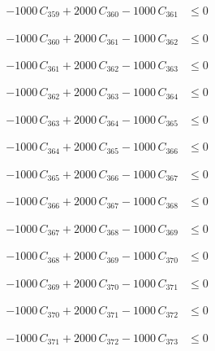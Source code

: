 \documentclass[a4paper,11pt]{article}
\begin{document}
\begin{align}
-1000\,C_{359} + 2000\,C_{360} - 1000\,C_{361} &\leq 0 \nonumber
\end{align}

\begin{align}
-1000\,C_{360} + 2000\,C_{361} - 1000\,C_{362} &\leq 0 \nonumber
\end{align}

\begin{align}
-1000\,C_{361} + 2000\,C_{362} - 1000\,C_{363} &\leq 0 \nonumber
\end{align}

\begin{align}
-1000\,C_{362} + 2000\,C_{363} - 1000\,C_{364} &\leq 0 \nonumber
\end{align}

\begin{align}
-1000\,C_{363} + 2000\,C_{364} - 1000\,C_{365} &\leq 0 \nonumber
\end{align}

\begin{align}
-1000\,C_{364} + 2000\,C_{365} - 1000\,C_{366} &\leq 0 \nonumber
\end{align}

\begin{align}
-1000\,C_{365} + 2000\,C_{366} - 1000\,C_{367} &\leq 0 \nonumber
\end{align}

\begin{align}
-1000\,C_{366} + 2000\,C_{367} - 1000\,C_{368} &\leq 0 \nonumber
\end{align}

\begin{align}
-1000\,C_{367} + 2000\,C_{368} - 1000\,C_{369} &\leq 0 \nonumber
\end{align}

\begin{align}
-1000\,C_{368} + 2000\,C_{369} - 1000\,C_{370} &\leq 0 \nonumber
\end{align}

\begin{align}
-1000\,C_{369} + 2000\,C_{370} - 1000\,C_{371} &\leq 0 \nonumber
\end{align}

\begin{align}
-1000\,C_{370} + 2000\,C_{371} - 1000\,C_{372} &\leq 0 \nonumber
\end{align}

\begin{align}
-1000\,C_{371} + 2000\,C_{372} - 1000\,C_{373} &\leq 0 \nonumber
\end{align}
\end{document}
